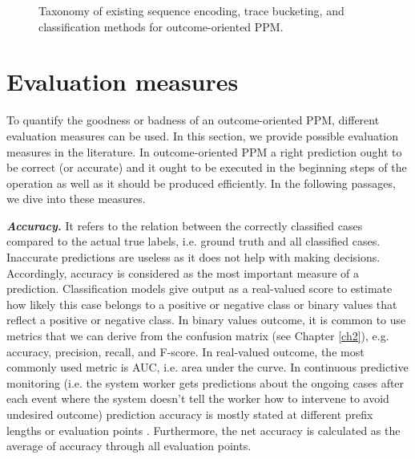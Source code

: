 \begin{figure}[htb]
	\begin{center}
		\caption[Taxonomy of methods for outcome-oriented PPM]{Taxonomy of existing sequence encoding, trace bucketing, and classification methods for outcome-oriented PPM.}
		\label{fig:bucenc}
	\end{center}
\end{figure}



\section{Evaluation measures} \label{sec32}
To quantify the goodness or badness of an outcome-oriented PPM, different evaluation measures can be used. In this section, we provide possible evaluation measures in the literature. In outcome-oriented PPM a right prediction ought to be correct (or accurate) and it ought to be executed in the beginning steps of the operation as well as it should be produced efficiently. In the following passages, we dive into these measures.


\textbf{\textit{Accuracy.}} It refers to the relation between the correctly classified cases compared to the actual true labels, i.e. ground truth and all classified cases. Inaccurate predictions are useless as it does not help with making decisions. Accordingly, accuracy is considered as the most important measure of a prediction. 
Classification models give output as a real-valued score to estimate how likely this case belongs to a positive or negative class or binary values that reflect a positive or negative class. In binary values outcome, it is common to use metrics that we can derive from the confusion matrix (see Chapter \ref{ch2}), e.g. accuracy, precision, recall, and F-score. In real-valued outcome, the most commonly used metric is AUC, i.e. area under the curve. In continuous predictive monitoring (i.e. the system worker gets predictions about the ongoing cases after each event where the system doesn't tell the worker how to intervene to avoid undesired outcome) prediction accuracy is mostly stated at different prefix lengths or evaluation points \cite{verenich2016complex, van2012process, leontjeva2016complex}. Furthermore, the net accuracy is calculated as the average of accuracy through all evaluation points.

